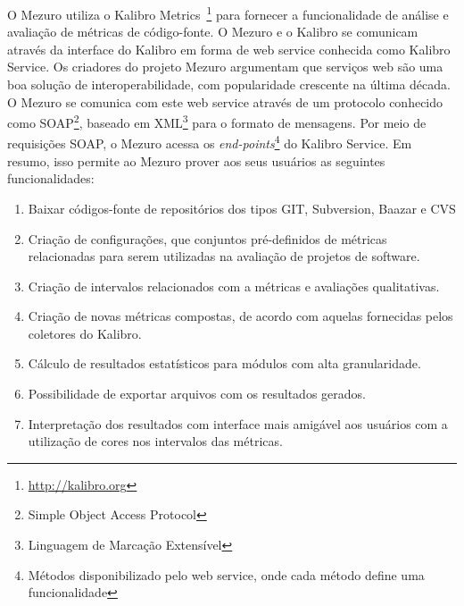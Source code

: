 
O Mezuro utiliza o Kalibro Metrics~\footnote{\url{http://kalibro.org}} para fornecer a funcionalidade de análise e avaliação de métricas de código-fonte. O Mezuro e o Kalibro se comunicam através da interface do Kalibro em forma de web service conhecida como Kalibro Service.
%
Os criadores do projeto Mezuro argumentam que serviços web são uma boa solução de interoperabilidade, com popularidade crescente na última década. O Mezuro se comunica com este web service através de um protocolo conhecido como SOAP\footnote{Simple Object Access Protocol}, baseado em XML\footnote{Linguagem de Marcação Extensível} para o formato de mensagens.
%
Por meio de requisições SOAP, o Mezuro acessa os \textit{end-points}\footnote{Métodos disponibilizado pelo web service, onde cada método define uma funcionalidade} do Kalibro Service. Em resumo, isso permite ao Mezuro prover aos seus usuários as seguintes funcionalidades:

\begin{enumerate}
\item Baixar códigos-fonte de repositórios dos tipos GIT, Subversion, Baazar e CVS
\item Criação de configurações, que conjuntos pré-definidos de métricas relacionadas para serem utilizadas na avaliação de projetos de software.
\item Criação de intervalos relacionados com a métricas e avaliações qualitativas.
\item Criação de novas métricas compostas, de acordo com aquelas fornecidas pelos coletores do Kalibro.
\item Cálculo de resultados estatísticos para módulos com alta granularidade.
\item Possibilidade de exportar arquivos com os resultados gerados.
\item Interpretação dos resultados com interface mais amigável aos usuários com a utilização de cores nos intervalos das métricas.
\end{enumerate}



